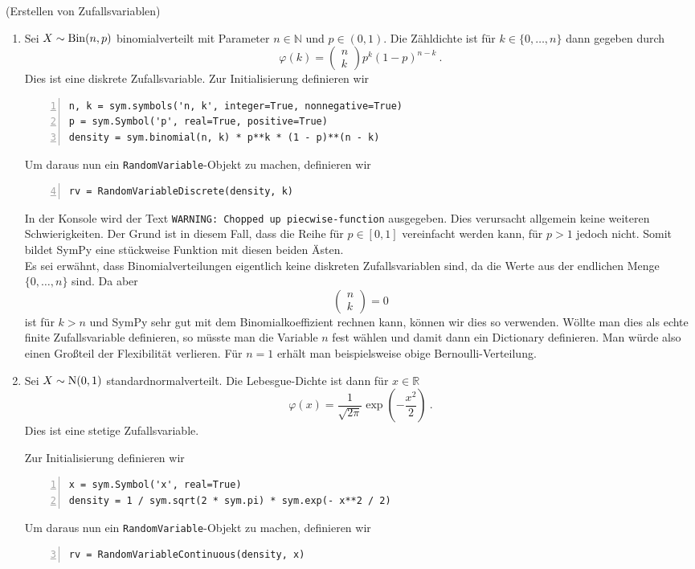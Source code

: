 \begin{Beispiel}{(Erstellen von Zufallsvariablen)}
\begin{enumerate}[label=(\roman*)]
\item Sei $X \sim \operatorname{Bin}(n, p)$ binomialverteilt mit Parameter $n \in \mathbb{N}$ und $p \in (0, 1)$. Die Zähldichte ist für $k \in \{0, \dots, n\}$ dann gegeben durch
\[\varphi(k) = \begin{pmatrix}n \\ k\end{pmatrix} p^k (1 - p)^{n-k}~.\]
Dies ist eine diskrete Zufallsvariable. Zur Initialisierung definieren wir
\begin{lstlisting}[numbers=left, numberstyle=\tiny\color{codegray}]
n, k = sym.symbols('n, k', integer=True, nonnegative=True)
p = sym.Symbol('p', real=True, positive=True)
density = sym.binomial(n, k) * p**k * (1 - p)**(n - k)
\end{lstlisting}
Um daraus nun ein \lstinline|RandomVariable|-Objekt zu machen, definieren wir
\begin{lstlisting}[numbers=left, numberstyle=\tiny\color{codegray}, firstnumber=4]
rv = RandomVariableDiscrete(density, k)
\end{lstlisting}
In der Konsole wird der Text \lstinline|WARNING: Chopped up piecwise-function| ausgegeben. Dies verursacht allgemein keine weiteren Schwierigkeiten. Der Grund ist in diesem Fall, dass die Reihe für $p \in [0, 1]$ vereinfacht werden kann, für $p > 1$ jedoch nicht. Somit bildet SymPy eine stückweise Funktion mit diesen beiden Ästen.\\
Es sei erwähnt, dass Binomialverteilungen eigentlich keine diskreten Zufallsvariablen sind, da die Werte aus der endlichen Menge $\{0, \dots, n\}$ sind. Da aber
\[\begin{pmatrix}n \\ k\end{pmatrix} = 0\]
ist für $k > n$ und SymPy sehr gut mit dem Binomialkoeffizient rechnen kann, können wir dies so verwenden. Wöllte man dies als echte finite Zufallsvariable definieren, so müsste man die Variable $n$ fest wählen und damit dann ein Dictionary definieren. Man würde also einen Großteil der Flexibilität verlieren. Für $n = 1$ erhält man beispielsweise obige Bernoulli-Verteilung.

\item Sei $X \sim \operatorname{N}(0, 1)$ standardnormalverteilt. Die Lebesgue-Dichte ist dann für $x \in \mathbb{R}$
\[\varphi(x) = \frac{1}{\sqrt{2 \pi}} \exp\left( - \frac{x^2}{2} \right)~.\]
Dies ist eine stetige Zufallsvariable.

\newpage

Zur Initialisierung definieren wir
\begin{lstlisting}[numbers=left, numberstyle=\tiny\color{codegray}]
x = sym.Symbol('x', real=True)
density = 1 / sym.sqrt(2 * sym.pi) * sym.exp(- x**2 / 2)
\end{lstlisting}
Um daraus nun ein \lstinline|RandomVariable|-Objekt zu machen, definieren wir
\begin{lstlisting}[numbers=left, numberstyle=\tiny\color{codegray}, firstnumber=3]
rv = RandomVariableContinuous(density, x)
\end{lstlisting}


\end{enumerate}
\end{Beispiel}
